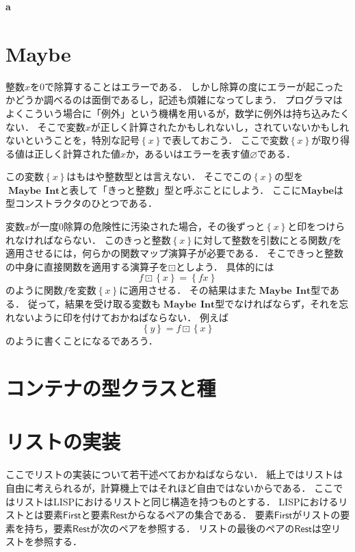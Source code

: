 \documentclass[twocolumn]{jsbook}
\newenvironment{leader}{\begingroup\bf}{\endgroup}
\newcommand{\typename}[1]{\mathbf{#1}}
\newcommand{\typeconstructor}[2]{\mathop{#1}\,#2}
\newcommand{\typeint}{\typename{Int}}
\newcommand{\typemaybe}{\typename{Maybe}}
\newcommand{\constantnothing}{\varnothing}
\newcommand{\binarymaybefunctormap}{\boxdot}
\newcommand{\maybetype}[1]{\left\{#1\right\}}
\newcommand{\specialwordname}[1]{\mathsf{#1}}
\newcommand{\specialwordfirst}{\specialwordname{First}}
\newcommand{\specialwordrest}{\specialwordname{Rest}}
\begin{document}
\begin{leader}
a
\end{leader}


\section{Maybe}

整数$x$を$0$で除算することはエラーである．
しかし除算の度にエラーが起こったかどうか調べるのは面倒であるし，記述も煩雑になってしまう．
プログラマはよくこういう場合に「例外」という機構を用いるが，数学に例外は持ち込みたくない．
そこで変数$x$が正しく計算されたかもしれないし，されていないかもしれないということを，特別な記号$\maybetype{x}$で表しておこう．
ここで変数$\maybetype{x}$が取り得る値は正しく計算された値$x$か，あるいはエラーを表す値$\constantnothing$である．

この変数$\maybetype{x}$はもはや整数型とは言えない．
そこでこの$\maybetype{x}$の型を$\typeconstructor{\typemaybe}{\typeint}$と表して「きっと整数」型と呼ぶことにしよう．
ここに$\typemaybe$は型コンストラクタのひとつである．

変数$x$が一度$0$除算の危険性に汚染された場合，その後ずっと$\maybetype{x}$と印をつけられなければならない．
このきっと整数$\maybetype{x}$に対して整数を引数にとる関数$f$を適用させるには，何らかの関数マップ演算子が必要である．
そこできっと整数の中身に直接関数を適用する演算子を$\binarymaybefunctormap$としよう．
具体的には$$f\binarymaybefunctormap\maybetype{x}=\maybetype{fx}$$のように関数$f$を変数$\maybetype{x}$に適用させる．
その結果はまた$\typeconstructor{\typemaybe}{\typeint}$型である．
従って，結果を受け取る変数も$\typeconstructor{\typemaybe}{\typeint}$型でなければならず，それを忘れないように印を付けておかねばならない．
例えば$$\maybetype{y}=f\binarymaybefunctormap\maybetype{x}$$のように書くことになるであろう．


\section{コンテナの型クラスと種}

\section{リストの実装}

ここでリストの実装について若干述べておかねばならない．
紙上ではリストは自由に考えられるが，計算機上ではそれほど自由ではないからである．
ここではリストはLISPにおけるリストと同じ構造を持つものとする．
LISPにおけるリストとは要素$\specialwordfirst$と要素$\specialwordrest$からなるペアの集合である．
要素$\specialwordfirst$がリストの要素を持ち，要素$\specialwordrest$が次のペアを参照する．
リストの最後のペアの$\specialwordrest$は空リストを参照する．
\end{document}
